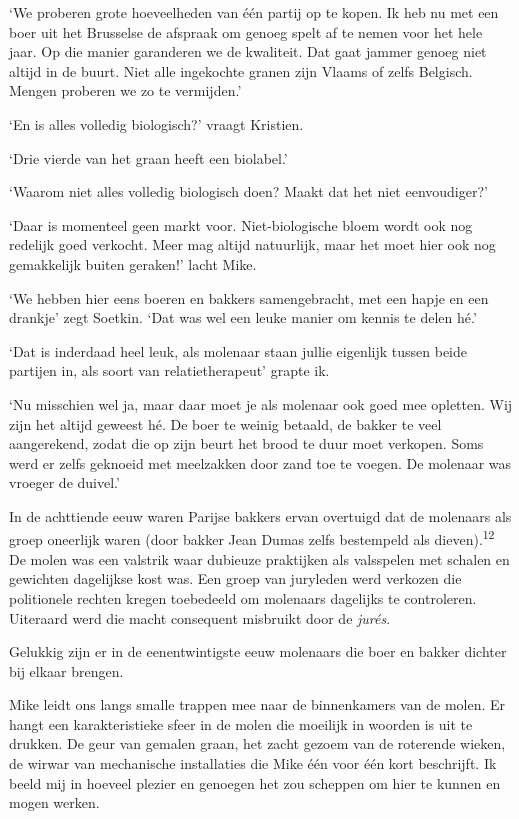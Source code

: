 \documentclass[
  11pt,
  dutch,
]{memoir}
\begin{document}
`We proberen grote hoeveelheden van één partij op te kopen. Ik heb nu
met een boer uit het Brusselse de afspraak om genoeg spelt af te nemen
voor het hele jaar. Op die manier garanderen we de kwaliteit. Dat gaat
jammer genoeg niet altijd in de buurt. Niet alle ingekochte granen zijn
Vlaams of zelfs Belgisch. Mengen proberen we zo te vermijden.'

`En is alles volledig biologisch?' vraagt Kristien.

`Drie vierde van het graan heeft een biolabel.'

`Waarom niet alles volledig biologisch doen? Maakt dat het niet
eenvoudiger?'

`Daar is momenteel geen markt voor. Niet-biologische bloem wordt ook nog
redelijk goed verkocht. Meer mag altijd natuurlijk, maar het moet hier
ook nog gemakkelijk buiten geraken!' lacht Mike.

`We hebben hier eens boeren en bakkers samengebracht, met een hapje en
een drankje' zegt Soetkin. `Dat was wel een leuke manier om kennis te
delen hé.'

`Dat is inderdaad heel leuk, als molenaar staan jullie eigenlijk tussen
beide partijen in, als soort van relatietherapeut' grapte ik.

`Nu misschien wel ja, maar daar moet je als molenaar ook goed mee
opletten. Wij zijn het altijd geweest hé. De boer te weinig betaald, de
bakker te veel aangerekend, zodat die op zijn beurt het brood te duur
moet verkopen. Soms werd er zelfs geknoeid met meelzakken door zand toe
te voegen. De molenaar was vroeger de duivel.'

In de achttiende eeuw waren Parijse bakkers ervan overtuigd dat de
molenaars als groep oneerlijk waren (door bakker Jean Dumas zelfs
bestempeld als dieven).\textsuperscript{12} De molen was een valstrik
waar dubieuze praktijken als valsspelen met schalen en gewichten
dagelijkse kost was. Een groep van juryleden werd verkozen die
politionele rechten kregen toebedeeld om molenaars dagelijks te
controleren. Uiteraard werd die macht consequent misbruikt door de
\emph{jurés}.

Gelukkig zijn er in de eenentwintigste eeuw molenaars die boer en bakker
dichter bij elkaar brengen.

Mike leidt ons langs smalle trappen mee naar de binnenkamers van de
molen. Er hangt een karakteristieke sfeer in de molen die moeilijk in
woorden is uit te drukken. De geur van gemalen graan, het zacht gezoem
van de roterende wieken, de wirwar van mechanische installaties die Mike
één voor één kort beschrijft. Ik beeld mij in hoeveel plezier en
genoegen het zou scheppen om hier te kunnen en mogen werken.
\end{document}
